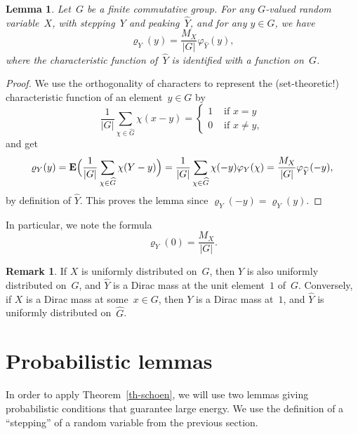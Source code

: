 \documentclass[12pt]{amsart}
\numberwithin{equation}{section}
\newcommand{\expect}{\mathbf{E}}
\renewcommand{\rho}{\varrho}
\theoremstyle{plain}
\newtheorem{lemma}[theorem]{Lemma}
\theoremstyle{remark}
\theoremstyle{definition}
\newtheorem{remark}[theorem]{Remark}
\begin{document}
\begin{lemma}\label{lm-bgk-link}
  Let~$G$ be a finite commutative group. For any $G$-valued random
  variable~$X$, with stepping~$Y$ and peaking~$\widehat{Y}$, and for any
  $y\in G$, we have
  $$
  \rho_Y(y)=\frac{M_X}{|G|}\varphi_{\widehat{Y}}(y),
  $$
  where the characteristic function of~$\widehat{Y}$ is identified with
  a function on~$G$.
\end{lemma}

\begin{proof}
  We use the orthogonality of characters to represent the
  (set-theoretic!) characteristic function of an element~$y\in G$ by
  $$
  \frac{1}{|G|}\sum_{\chi\in\widehat{G}}\chi(x-y) =\begin{cases}
    1&\text{ if } x=y\\
    0&\text{ if } x\not=y,
  \end{cases}
  $$
  and get
  $$
  \rho_Y(y)=\expect\Bigl(
  \frac{1}{|G|}\sum_{\chi\in\widehat{G}}\chi(Y-y)\Bigr)
  =\frac{1}{|G|}\sum_{\chi\in\widehat{G}} \chi(-y)\varphi_Y(\chi)=
  \frac{M_X}{|G|}\varphi_{\widehat{Y}}(-y),
  $$
  by definition of $\widehat{Y}$.  This proves the lemma since
  $\rho_Y(-y)=\rho_Y(y)$.
\end{proof}

In particular, we note the formula
\begin{equation}\label{eq-rho1}
  \rho_Y(0)=\frac{M_X}{|G|}.
\end{equation}

\begin{remark}
  If $X$ is uniformly distributed on~$G$, then $Y$ is also uniformly
  distributed on~$G$, and $\widehat{Y}$ is a Dirac mass at the unit
  element~$1$ of~$G$. Conversely, if $X$ is a Dirac mass at
  some~$x\in G$, then $Y$ is a Dirac mass at~$1$, and $\widehat{Y}$ is
  uniformly distributed on~$\widehat{G}$.
\end{remark}

\section{Probabilistic lemmas}\label{sec-prob-lemmas}

In order to apply Theorem~\ref{th-schoen}, we will use two lemmas giving
probabilistic conditions that guarantee large energy. We use the
definition of a ``stepping'' of a random variable from the previous
section.
\end{document}
